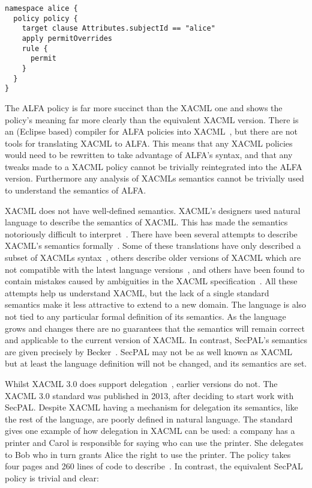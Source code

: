 \documentclass[thesis.tex]{subfiles}
\begin{document}
\begin{lstlisting}
namespace alice {
  policy policy {
    target clause Attributes.subjectId == "alice"
    apply permitOverrides
    rule {
      permit
    }
  }
}
\end{lstlisting}

The ALFA policy is far more succinct than the XACML one and shows the
policy's meaning far more clearly than the equivalent XACML version.
There is an (Eclipse based) compiler for ALFA policies into
XACML~\cite{axiomaics_axiomatics_2012}, but there are not tools for
translating XACML to ALFA.  This means that any XACML policies would
need to be rewritten to take advantage of ALFA's syntax, and that any
tweaks made to a XACML policy cannot be trivially reintegrated into
the ALFA version.  Furthermore any analysis of XACMLs semantics cannot
be trivially used to understand the semantics of ALFA.

XACML does not have well-defined semantics. XACML's designers used
natural language to describe the semantics of XACML. This has made the
semantics notoriously difficult to
interpret~\cite{ramli_detecting_2015}. There have been several
attempts to describe XACML's semantics
formally~\cite{ramli_xacml_2012,ramli_logic_2014,bryans_reasoning_2005}. Some
of these translations have only described a subset of XACMLs
syntax~\cite{halpern_using_2008}, others describe older versions of
XACML which are not compatible with the latest language
versions~\cite{ahn_reasoning_2010}, and others have been found to
contain mistakes caused by ambiguities in the XACML
specification~\cite{bruns_access-control_2008,halpern_using_2008}.
All these attempts help us understand XACML, but the lack of a single
standard semantics make it less attractive to extend to a new domain.
The language is also not tied to any particular formal definition of
its semantics.  As the language grows and changes there are no
guarantees that the semantics will remain correct and applicable to
the current version of XACML. In contrast, SecPAL's semantics are
given precisely by Becker~\cite{becker_secpal:_2010}.  SecPAL may not
be as well known as XACML but at least the language definition will
not be changed, and its semantics are set.

Whilst XACML 3.0 does support delegation~\cite{oasis_xacml_2010},
earlier versions do not. The XACML 3.0 standard was published in 2013,
after deciding to start work with SecPAL.  Despite XACML having a
mechanism for delegation its semantics, like the rest of the language,
are poorly defined in natural language.  The standard gives one
example of how delegation in XACML can be used: a company has a
printer and Carol is responsible for saying who can use the printer.
She delegates to Bob who in turn grants Alice the right to use the
printer.  The policy takes four pages and 260 lines of code to
describe~\cite{oasis_xacml_2010}.  In contrast, the equivalent SecPAL
policy is trivial and clear:
\end{document}
